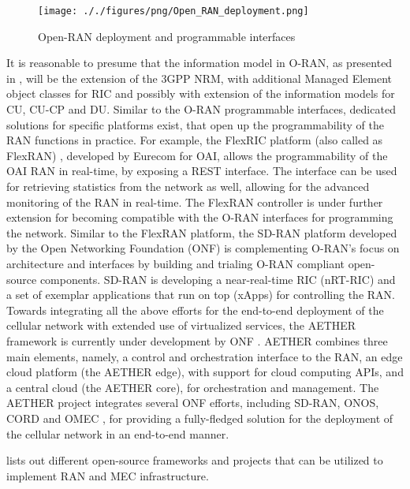 \begin{figure}[h]
\centering
\texttt{[image: ././figures/png/Open\_RAN\_deployment.png]}
\caption{Open-RAN deployment and programmable interfaces}
\label{fig:Open-RAN-deployment}
\end{figure}

It is reasonable to presume that the information model in O-RAN, as presented in , will be the extension of the 3GPP NRM, with additional Managed Element object classes for RIC and possibly with extension of the information models for CU, CU-CP and DU. Similar to the O-RAN programmable interfaces, dedicated solutions for specific platforms exist, that open up the programmability of the RAN functions in practice. For example, the FlexRIC platform (also called as FlexRAN) \cite{flexric,flexran}, developed by Eurecom for OAI, allows the programmability of the OAI RAN in real-time, by exposing a REST interface. The interface can be used for retrieving statistics from the network as well, allowing for the advanced monitoring of the RAN in real-time. The FlexRAN controller is under further extension for becoming compatible with the O-RAN interfaces for programming the network.  Similar to the FlexRAN platform, the SD-RAN  platform developed by the Open Networking Foundation (ONF) is complementing O-RAN’s focus on architecture and interfaces by building and trialing O-RAN compliant open-source components. SD-RAN \cite{onf-sd-ran} is developing a near-real-time RIC (nRT-RIC) and a set of exemplar applications that run on top (xApps) for controlling the RAN. 
Towards integrating all the above efforts for the end-to-end deployment of the cellular network with extended use of virtualized services, the AETHER framework is currently under development by ONF \cite{onf-aether}. AETHER combines three main elements, namely, a control and orchestration interface to the RAN, an edge cloud platform (the AETHER edge), with support for cloud computing APIs, and a central cloud (the AETHER core), for orchestration and management. The AETHER project integrates several ONF efforts, including SD-RAN, ONOS\cite{berde2014onos}, CORD \cite{peterson2016central} and OMEC \cite{onf-omec}, for providing a fully-fledged solution for the deployment of the cellular network in an end-to-end manner. 

 lists out different open-source frameworks and projects that can be utilized to implement RAN and MEC infrastructure.


